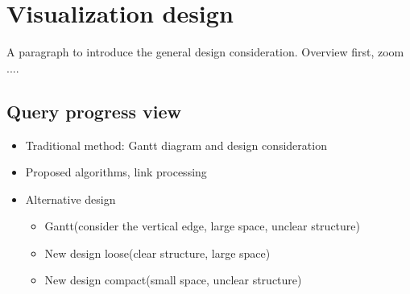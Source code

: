 
\section{Visualization design}
A paragraph to introduce the general design consideration. Overview first, zoom ....
\subsection{Query progress view}
\begin{itemize}
    \item Traditional method: Gantt diagram and design consideration 
    \item Proposed algorithms, link processing
    \item Alternative design
        \begin{itemize}
            \item Gantt(consider the vertical edge, large space, unclear structure)
            \item New design loose(clear structure, large space)
            \item New design compact(small space, unclear structure)
        \end{itemize}
\end{itemize}


